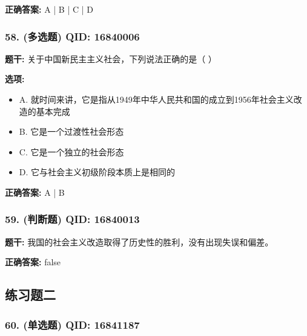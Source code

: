 \documentclass[12pt,UTF8]{ctexart}
\begin{document}
\textbf{正确答案:}
A | B | C | D

\vspace{0.3em}\hrulefill\vspace{0.7em}

\subsubsection*{58. (多选题) \small QID: 16840006}

\textbf{题干:}
关于中国新民主主义社会，下列说法正确的是（ ）

\textbf{选项:}
\begin{itemize}[leftmargin=*]

  \item A. 就时间来讲，它是指从1949年中华人民共和国的成立到1956年社会主义改造的基本完成

  \item B. 它是一个过渡性社会形态

  \item C. 它是一个独立的社会形态

  \item D. 它与社会主义初级阶段本质上是相同的

\end{itemize}

\textbf{正确答案:}
A | B

\vspace{0.3em}\hrulefill\vspace{0.7em}

\subsubsection*{59. (判断题) \small QID: 16840013}

\textbf{题干:}
我国的社会主义改造取得了历史性的胜利，没有出现失误和偏差。

\textbf{正确答案:}
false

\vspace{0.3em}\hrulefill\vspace{0.7em}

\subsection*{练习题二}

\subsubsection*{60. (单选题) \small QID: 16841187}
\end{document}
